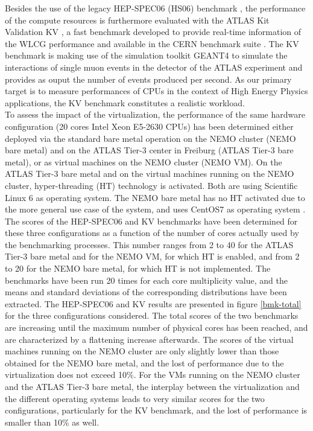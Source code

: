Besides the use of the legacy HEP-SPEC06 (HS06) benchmark \cite{Hepspec}, the performance of the compute resources is furthermore evaluated with the ATLAS Kit Validation
KV \cite{DeSalvo:2010zza}, a fast benchmark developed to provide real-time information of the WLCG performance and available in the CERN benchmark suite \cite{Alef:2017jyx}.
The KV benchmark is making use of the simulation toolkit GEANT4 \cite{Agostinelli:2002hh} to simulate the interactions of single muon events in the detector of the ATLAS experiment
and provides as ouput the number of events produced per second. As our primary target is to measure performances of CPUs in the context of High Energy Physics applications, the KV benchmark
constitutes a realistic workload. \\

To assess the impact of the virtualization, the performance of the same hardware configuration (20 cores Intel Xeon E5-2630 CPUs) has been determined either deployed via
the standard bare metal operation on the NEMO cluster (NEMO bare metal) and on the ATLAS Tier-3 center in Freiburg (ATLAS Tier-3 bare metal), or as virtual machines on the
NEMO cluster (NEMO VM). On the ATLAS Tier-3 bare metal and on the virtual machines running on the NEMO cluster, hyper-threading (HT) technology is activated. Both are using Scientific
Linux 6 \cite{SL6} as operating system. The NEMO bare metal has no HT activated due to the more general use case of the system, and uses CentOS7 as operating system \cite{CentOS7}. \\

The scores of the HEP-SPEC06 and KV benchmarks have been determined for these three configurations as a function of the number of cores actually used by the benchmarking processes.
This number ranges from 2 to 40 for the ATLAS Tier-3 bare metal and for the NEMO VM, for which HT is enabled, and from 2 to 20 for the NEMO bare metal, for which HT is not implemented.
The benchmarks have been run 20 times for each core multiplicity value, and the means and standard deviations of the corresponding distributions have been extracted.
The HEP-SPEC06 and KV results are presented in figure \ref{bmk-total} for the three configurations considered.
The total scores of the two benchmarks are increasing until the maximum number of physical cores has been reached, and are characterized by a flattening increase afterwards.
The scores of the virtual machines running on the NEMO cluster are only slightly lower than those obtained for the NEMO bare metal, and the lost of performance
due to the virtualization does not exceed 10$\%$.
For the VMs running on the NEMO cluster and the ATLAS Tier-3 bare metal, the interplay between the virtualization and the different operating systems leads to very similar scores for the two configurations,
particularly for the KV benchmark, and the lost of performance is smaller than 10$\%$ as well.

